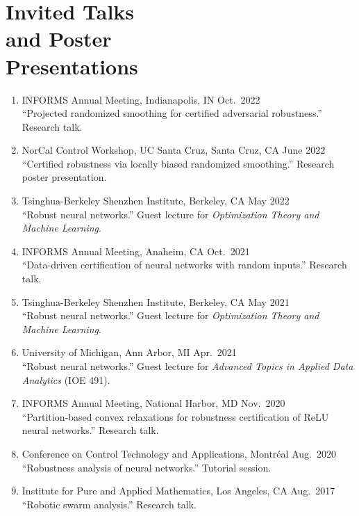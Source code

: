 \documentclass[11pt]{article}
\newcommand{\cvdate}[1]{\hfill#1}			%
\begin{document}
	\section{\texorpdfstring{Invited Talks \\[\baselineskip] and Poster \\ Presentations}{Invited Talks and Poster Presentations}}
	\hfill\vspace*{-3\baselineskip}
	\begin{enumerate}[label={\arabic*.}]
		\item INFORMS Annual Meeting, Indianapolis, IN \cvdate{Oct.\ 2022}\\
		``Projected randomized smoothing for certified adversarial robustness.'' Research talk.
		\item NorCal Control Workshop, UC Santa Cruz, Santa Cruz, CA \cvdate{June 2022}\\
		``Certified robustness via locally biased randomized smoothing.'' Research poster presentation.
		\item Tsinghua-Berkeley Shenzhen Institute, Berkeley, CA \cvdate{May 2022}\\
		``Robust neural networks.'' Guest lecture for \textit{Optimization Theory and Machine Learning}.
		\item INFORMS Annual Meeting, Anaheim, CA \cvdate{Oct.\ 2021}\\
		``Data-driven certification of neural networks with random inputs.'' Research talk.
		\item Tsinghua-Berkeley Shenzhen Institute, Berkeley, CA \cvdate{May 2021}\\
		``Robust neural networks.'' Guest lecture for \textit{Optimization Theory and Machine Learning}.
		\item University of Michigan, Ann Arbor, MI \cvdate{Apr.\ 2021}\\
		``Robust neural networks.'' Guest lecture for \textit{Advanced Topics in Applied Data Analytics} (IOE 491).
		\item INFORMS Annual Meeting, National Harbor, MD \cvdate{Nov.\ 2020}\\
		``Partition-based convex relaxations for robustness certification of ReLU neural networks.'' Research talk.
		\item Conference on Control Technology and Applications, Montr\'eal \cvdate{Aug.\ 2020}\\
		``Robustness analysis of neural networks.'' Tutorial session.
		\item Institute for Pure and Applied Mathematics, Los Angeles, CA \cvdate{Aug.\ 2017}\\
		``Robotic swarm analysis.'' Research talk.
	\end{enumerate}
	
\end{document}
